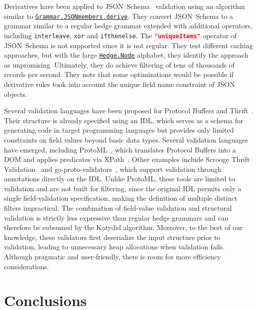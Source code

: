 \documentclass[runningheads]{llncs}
\newcommand{\link}[2]{\mbox{\hyperref[#2]{\lstinline{#1}}}\xspace}
\newcommand{\Node}{\link{Hedge.Node}{Hedge}}
\newcommand{\JSONmembersRuleDerive}{\link{Grammar.JSONmembers.derive}{def Grammar.JSONmembers.derive}}
\newcommand{\JSONSchema}{%
  JSON~Schema\xspace%
}
\newcommand{\uniqueItems}{%
  \lstinline[language=json]|"uniqueItems"|\xspace%
}
\newcommand{\DOM}{\ac{DOM}\xspace}
\newcommand{\IDL}{\ac{IDL}\xspace}
\newcommand{\JSON}{\ac{JSON}\xspace}
\begin{document}
Derivatives have been applied to JSON~Schema~\cite{holstege2019application} validation using an algorithm similar to \JSONmembersRuleDerive.
They convert \JSONSchema to a grammar similar to a regular hedge grammar extended with additional operators, including \lstinline{interleave}, \lstinline{xor} and \lstinline{ifthenelse}.
The \uniqueItems operator of \JSONSchema is not supported since it is not regular.
They test different caching approaches, but with the large \Node alphabet, they identify the approach as unpromising.
Ultimately, they do achieve filtering of tens of thousands of records per second.
They note that some optimizations would be possible if derivative rules took into account the unique field name constraint of \JSON objects.

Several validation languages have been proposed for Protocol Buffers and Thrift~\cite{thrift}.
Their structure is already specified using an \IDL, which serves as a schema for generating code in target programming languages but provides only limited constraints on field values beyond basic data types.
Several validation languages have emerged, including ProtoML~\cite{kalman2013protoml}, which translates Protocol Buffers into a \DOM and applies predicates via XPath~\cite{xpath}.
Other examples include Scrooge Thrift Validation~\cite{thriftvalidation} and go-proto-validators~\cite{protovalidators}, which support validation through annotations directly on the \IDL.
Unlike ProtoML, these tools are limited to validation and are not built for filtering, since the original \IDL permits only a single field-validation specification, making the definition of multiple distinct filters impractical.
The combination of field-value validation and structural validation is strictly less expressive than regular hedge grammars and can therefore be subsumed by the Katydid algorithm.
Moreover, to the best of our knowledge, these validators first deserialize the input structure prior to validation, leading to unnecessary heap allocations when validation fails.
Although pragmatic and user-friendly, there is room for more efficiency considerations.

\section{Conclusions}
\label{section_future}
\end{document}
